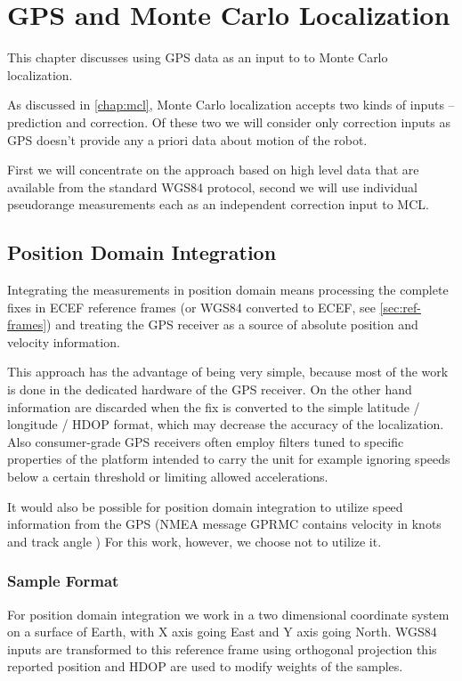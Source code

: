 \chapter{GPS and Monte Carlo Localization}
\label{chap:gps-and-mcl}

This chapter discusses using GPS data as an input to to Monte Carlo localization.

As discussed in \cref{chap:mcl}, Monte Carlo localization accepts two kinds of
inputs -- prediction and correction.
Of these two we will consider only correction inputs as GPS doesn't provide any
a priori data about motion of the robot.

First we will concentrate on the approach based on high level data that are available
from the standard WGS84 protocol,
second we will use individual pseudorange measurements each as an independent
correction input to MCL.

\section{Position Domain Integration}
Integrating the measurements in position domain means processing the complete
fixes in ECEF reference frames (or WGS84 converted to ECEF, see \cref{sec:ref-frames})
and treating the GPS receiver as a source of absolute position and velocity information.

This approach has the advantage of being very simple, because most of the work
is done in the dedicated hardware of the GPS receiver.
On the other hand information are discarded when the fix is converted to the simple
latitude / longitude / HDOP format, which may decrease the accuracy of the
localization.
Also consumer-grade GPS receivers often employ filters tuned to specific properties
of the platform intended to carry the unit for example ignoring speeds
below a certain threshold or limiting allowed accelerations.

It would also be possible for position domain integration to utilize speed information
from the GPS (NMEA message GPRMC contains velocity in knots and track angle \cite{depriest})
For this work, however, we choose not to utilize it.

\subsection{Sample Format}
For position domain integration we work in a two dimensional coordinate
system on a surface of Earth, with X axis going East and Y axis going North.
WGS84 inputs are transformed to this reference frame using orthogonal projection
this reported position and HDOP are used to modify weights of the samples.

